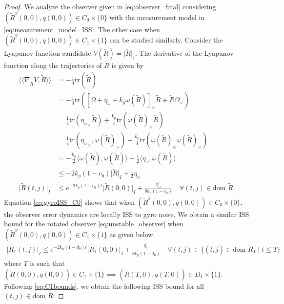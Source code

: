 \documentclass{article}
\newcommand{\dom}{\text{dom }}
\newcommand{\trace}[1]{\text{tr}\left(#1\right)}
\newcommand{\Rtilde}{\tilde{R}}
\newcommand{\normSOthree}[1]{{{\vert}#1 {\vert}_I}}
\newcommand{\cross}[1]{{#1}_\times}
\newcommand{\expo}[1]{e^{#1}}
\newcommand{\inprod}[2]{\langle #1, #2 \rangle}
\newcommand{\noisegyro}{\eta_\omega}
\newcommand{\maxnoisegyro}{\overline{\eta_\omega}}
\newcommand{\dualpairing}[2]{\langle\langle #1 , #2 \rangle\rangle}
\newcommand{\grad}[2]{\nabla_{#1}{#2}}
\begin{document}
\begin{proof}
We analyze the observer given in \eqref{eq:observer_final} considering ${(\Rtilde^y(0,0), q(0,0))}\in C_0\times\{0\}$ with the measurement model in \eqref{eq:measurement_model_ISS}. The other case when ${(\Rtilde^y(0,0), q(0,0))}\in C_1\times\{1\}$ can be studied similarly. Consider the Lyapunov function candidate $V(\Rtilde) = \normSOthree\Rtilde$. The derivative of the Lyapunov function along the trajectories of $\Rtilde$ is given by
\begin{align}
    \dualpairing{\grad{\Rtilde}{V}}{\dot\Rtilde} &= -\frac{1}{4}\trace{\dot{\Rtilde}} \nonumber\\
    &= -\frac{1}{4}\trace{\cross{\left[\Omega + \noisegyro + k_p \omega(\Rtilde ) \right]} \Rtilde + \Rtilde\cross{\Omega}} \nonumber\\
    &= \frac{1}{4}\trace{\cross{\noisegyro}\Rtilde} + \frac{k_p}{4}\trace{\cross{\omega(\Rtilde )}\Rtilde} \nonumber\\
    &= \frac{1}{4}\trace{\cross{\noisegyro}, \cross{\omega(\Rtilde)}} + \frac{k_p}{4}\trace{\cross{\omega(\Rtilde)}\cross{\omega(\Rtilde)}}\nonumber \\
    &= -\frac{k_p}{2}\inprod{\omega(\Rtilde)}{\omega(\Rtilde)} - \frac{1}{2}\inprod{\noisegyro}{\omega(\Rtilde)} \nonumber\\
    &\leq -2k_p(1-c_0)\normSOthree{\Rtilde} + \frac{1}{2}\maxnoisegyro \nonumber\\
    \normSOthree{\Rtilde(t,j)} &\leq \expo{-2k_p(1-c_0)t}\normSOthree{\Rtilde(0,0)} + \frac{\maxnoisegyro}{8k_p(1-c_0)} \quad \forall (t,j)\in\dom \Rtilde.\label{eq:gyroISS_C0}
\end{align}
Equation \eqref{eq:gyroISS_C0} shows that when ${(\Rtilde^y(0,0), q(0,0))\in C_0\times\{0\}}$, the observer error dynamics are locally ISS to gyro noise. We obtain a similar ISS bound for the rotated observer \eqref{eq:unstable_observer} when ${(\Rtilde^y(0,0), q(0,0))} \in C_1\times\{1\}$ as given below.
\begin{align}
    \normSOthree{\Rtilde_1(t,j)} \leq \expo{-2\overline{k_p}(1-d_0)t}\normSOthree{\Rtilde_1(0,0)} + \frac{\maxnoisegyro}{8\overline{k_p}(1-d_0)} \quad \forall (t,j)\in\{(\overline{t},\overline{j})\in\dom \Rtilde_1 \mid \overline{t} \leq T\} \label{eq:gyroISS_C1}
\end{align}
where $T$ is such that $(\Rtilde(0,0),q(0,0))\in C_1\times\{1\} \implies (\Rtilde(T,0),q(T,0))\in D_1\times\{1\}$. Following \eqref{eq:C1bounds}, we obtain the following ISS bound for all $(t,j) \in \dom\Rtilde$:

\end{proof}
\end{document}
